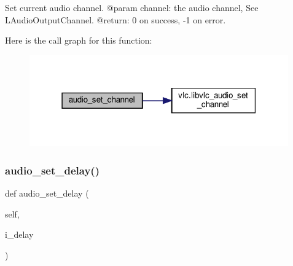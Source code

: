 \begin{DoxyVerb}Set current audio channel.
@param channel: the audio channel, See L{AudioOutputChannel}.
@return: 0 on success, -1 on error.
\end{DoxyVerb}
 Here is the call graph for this function\+:
\nopagebreak
\begin{figure}[H]
\begin{center}
\leavevmode
\includegraphics[width=316pt]{classvlc_1_1_media_player_ae2b42843e5513b17e8d0e601a7cfe6fb_cgraph}
\end{center}
\end{figure}
\mbox{\label{classvlc_1_1_media_player_a0f4fdb7a7b7fa38629ee2f9930ed0967}} 
\subsubsection{\texorpdfstring{audio\+\_\+set\+\_\+delay()}{audio\_set\_delay()}}
{\footnotesize\ttfamily def audio\+\_\+set\+\_\+delay (\begin{DoxyParamCaption}\item[{}]{self,  }\item[{}]{i\+\_\+delay }\end{DoxyParamCaption})}

